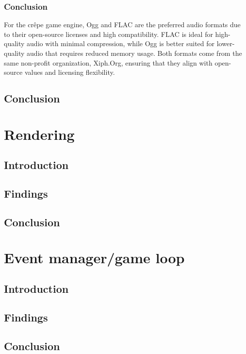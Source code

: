 \documentclass{projdoc}
\begin{document}
\subsubsection{Conclusion}

For the cr\^epe game engine, Ogg and FLAC are the preferred audio formats due to
their open-source licenses and high compatibility. FLAC is ideal for high-quality
audio with minimal compression, while Ogg is better suited for lower-quality audio
that requires reduced memory usage. Both formats come from the same non-profit
organization, Xiph.Org, ensuring that they align with open-source values and
licensing flexibility.

\subsection{Conclusion}

\section{Rendering}

\subsection{Introduction}

\subsection{Findings}

\subsection{Conclusion}

\section{Event manager/game loop}

\subsection{Introduction}

\subsection{Findings}

\subsection{Conclusion}
\end{document}
